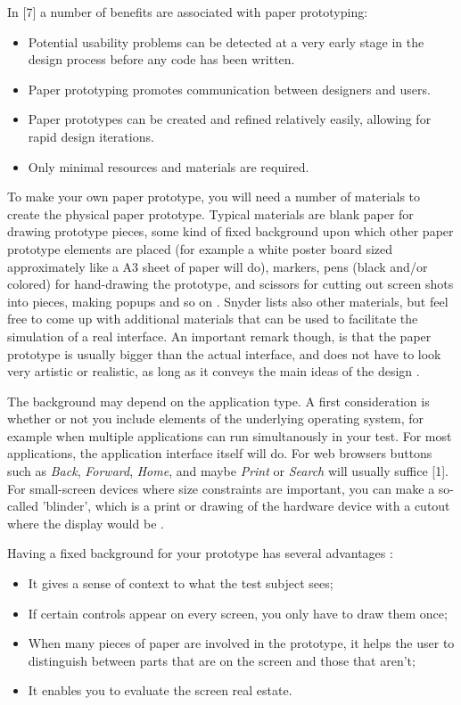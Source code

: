 In [7] a number of benefits are associated with paper prototyping:
\begin{itemize}
	\item Potential usability problems can be detected at a very early stage in the design process before any code has been written.
	\item Paper prototyping promotes communication between designers and users.
	\item Paper prototypes can be created and refined relatively easily, allowing for rapid design iterations.
	\item Only minimal resources and materials are required.
\end{itemize}

To make your own paper prototype, you will need a number of materials to create the physical paper prototype. Typical materials are blank paper for drawing prototype pieces, some kind of fixed background upon which other paper prototype elements are placed (for example a white poster board sized approximately like a A3 sheet of paper will do), markers, pens (black and/or colored) for hand-drawing the prototype, and scissors for cutting out screen shots into pieces, making popups and so on \cite{Snyder:2003}. Snyder lists also other materials, but feel free to come up with additional materials that can be used to facilitate the simulation of a real interface. An important remark though, is that the paper prototype is usually bigger than the actual interface, and does not have to look very artistic or realistic, as long as it conveys the main ideas of the design \cite{Snyder:2003}.

The background may depend on the application type. A first consideration is whether or not you include elements of the underlying operating system, for example when multiple applications can run simultanously in your test. For most applications, the application interface itself will do. For web browsers buttons such as \textit{Back}, \textit{Forward}, \textit{Home}, and maybe \textit{Print} or \textit{Search} will usually suffice [1]. For small-screen devices where size constraints are important, you can make a so-called 'blinder', which is a print or drawing of the hardware device with a cutout where the display would be \cite{Snyder:2003}.

Having a fixed background for your prototype has several advantages \cite{Snyder:2003}:
\begin{itemize}
	\item It gives a sense of context to what the test subject sees;
	\item If certain controls appear on every screen, you only have to draw them once;
	\item When many pieces of paper are involved in the prototype, it helps the user to distinguish between parts that are on the screen and those that aren't;
	\item It enables you to evaluate the screen real estate.
\end{itemize}

